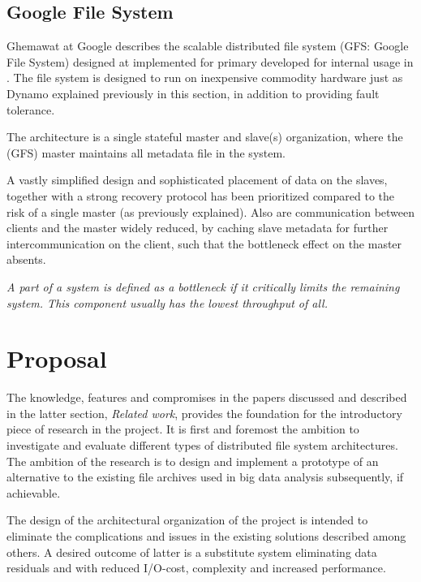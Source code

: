 \subsection*{Google File System}
Ghemawat \etal at Google describes the scalable distributed file system (GFS: Google File System) designed at implemented for primary developed for internal usage in \cite{Ghemawat:2003:GFS:945445.945450}. The file system is designed to run on inexpensive commodity hardware just as \eg Dynamo explained previously in this section, in addition to providing fault tolerance. 

The architecture is a single stateful master and slave(s) organization, where the (GFS) master maintains all metadata file in the system. 
\newline

A vastly simplified design and sophisticated placement of data on the slaves, together with a strong recovery protocol has been prioritized compared to the risk of a single master (as previously explained). Also are communication between clients and the master widely reduced, by caching slave metadata for further intercommunication on the client, such that the bottleneck effect on the master absents.
\vspace*{3mm}

\begin{definition} \label{def:bottle}
\textit{A part of a system is defined as a bottleneck if it critically limits the remaining system. This component usually has the lowest throughput of all.}
\end{definition}
\vspace*{3mm}

\section{Proposal} \label{sec:proposal}
The knowledge, features and compromises in the papers discussed and described in the latter section, \textit{Related work}, provides the foundation for the introductory piece of research in the project. It is first and foremost the ambition to investigate and evaluate different types of distributed file system architectures. The ambition of the research is to design and implement a prototype of an alternative to the existing file archives used in big data analysis subsequently, if achievable.
\newline

The design of the architectural organization of the project is intended to eliminate the complications and issues in the existing solutions described among others. A desired outcome of latter is a substitute system eliminating data residuals and with reduced I/O-cost, complexity and increased performance.
\newline


